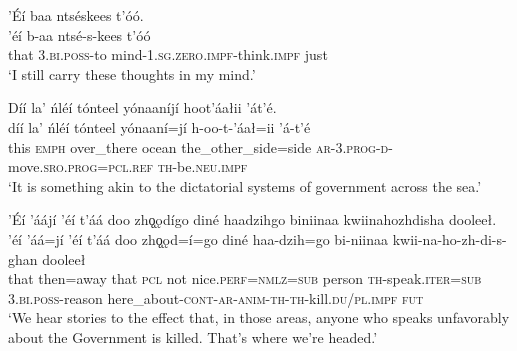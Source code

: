 \ea\label{ex:text7-3-1}
’Éí baa ntséskees t’óó.\\
\gll ’éí	b-aa	ntsé-s-kees	t’óó\\
     that	3.\textsc{bi}.\textsc{poss}-to	mind-1.\textsc{sg}.\textsc{zero}.\textsc{impf}-think.\textsc{impf}	just\\
\glt `I still carry these thoughts in my mind.'
\z

\ea\label{ex:text7-3-2}
Díí la’ ńléí tónteel yónaaníjí hoot’áałii ’át’é.\\
\gll díí	la’	ńléí	tónteel	yónaaní=jí	h-oo-t-’áał=ii	’á-t’é\\
     this	\textsc{emph}	over\_there	ocean	the\_other\_side=side	\textsc{ar}-3.\textsc{prog}-\textsc{d}-move.\textsc{sro}.\textsc{prog}=\textsc{pcl}.\textsc{ref}	\textsc{th}-be.\textsc{neu}.\textsc{impf}\\
\glt `It is something akin to the dictatorial systems of government across the sea.'
\z

\ea\label{ex:text7-3-3}
’Éí ’áájí ’éí t’áá doo zhǫ̨ǫdígo diné haadzihgo biniinaa kwiinahozhdisha dooleeł.\\
\gll ’éí	’áá=jí	’éí	t’áá	doo	zhǫ̨ǫd=í=go	diné	haa-dzih=go	bi-niinaa	kwii-na-ho-zh-di-s-ghan	dooleeł\\
     that	then=away	that	\textsc{pcl}	not	nice.\textsc{perf}=\textsc{nmlz}=\textsc{sub}	person	\textsc{th}-speak.\textsc{iter}=\textsc{sub}	3.\textsc{bi}.\textsc{poss}-reason	here\_about-\textsc{cont}-\textsc{ar}-\textsc{anim}-\textsc{th}-\textsc{th}-kill.\textsc{du}/\textsc{pl}.\textsc{impf}	\textsc{fut}\\
\glt `We hear stories to the effect that, in those areas, anyone who speaks unfavorably about the Government is killed. That's where we're headed.'
\z

